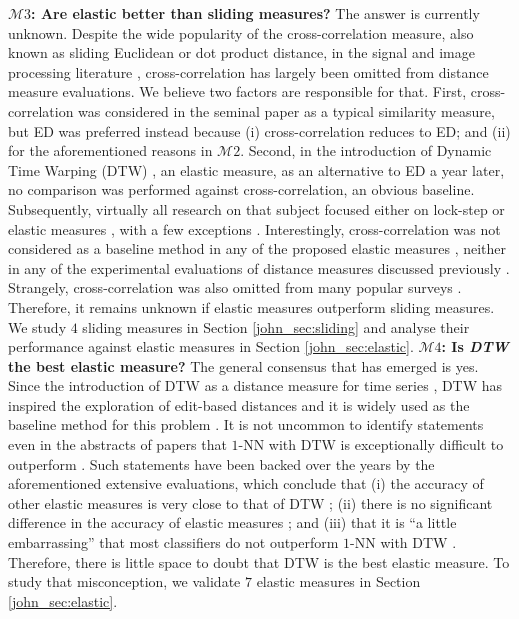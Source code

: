 \documentclass[11pt]{article}
\begin{document}
\newline \textbf{$\mathcal{M}3$: Are elastic better than sliding measures?} The answer is currently unknown. Despite the wide popularity of the cross-correlation measure, also known as sliding Euclidean or dot product distance, in the signal and image processing literature \cite{brown1992survey}, cross-correlation has largely been omitted from distance measure evaluations. We believe two factors are responsible for that. First, cross-correlation was considered in the seminal paper \cite{agrawal1993} as a typical similarity measure, but ED was preferred instead because (i) cross-correlation reduces to ED; and (ii) for the aforementioned reasons in $\mathcal{M}2$. Second, in the introduction of Dynamic Time Warping (DTW) \cite{berndt1994using}, an elastic measure, as an alternative to ED a year later, no comparison was performed against cross-correlation, an obvious baseline. Subsequently, virtually all research on that subject focused either on lock-step or elastic measures \cite{esling2012time,echihabi2018lernaean}, with a few exceptions \cite{li1996hierarchyscan,sakurai2005braid,paparrizos2015k}. Interestingly, cross-correlation was not considered as a baseline method in any of the proposed elastic measures \cite{chen2004marriage,chen2005robust,chen2007spade,morse2007efficient,stefan2013move,vlachos2002discovering}, neither in any of the experimental evaluations of distance measures discussed previously \cite{ding2008querying,wang2013experimental,lines2015time,bagnall2017great}. Strangely, cross-correlation was also omitted from many popular surveys \cite{esling2012time,ralanamahatana2005mining}. Therefore, it remains unknown if elastic measures outperform sliding measures. We study $4$ sliding measures in Section \ref{john_sec:sliding} and analyse their performance against elastic measures in Section \ref{john_sec:elastic}.
\newline \textbf{$\mathcal{M}4$: Is {\em DTW} the best elastic measure?} The general consensus that has emerged is yes. Since the introduction of DTW as a distance measure for time series \cite{berndt1994using}, DTW has inspired the exploration of edit-based distances and it is widely used as the baseline method for this problem \cite{chen2004marriage,chen2005robust,chen2007spade,morse2007efficient,stefan2013move,vlachos2002discovering,lines2015time,paparrizos2015k,bagnall2017great}. It is not uncommon to identify statements even in the abstracts of papers that $1$-NN with DTW is exceptionally difficult to outperform \cite{xi2006fast,petitjean2011global,petitjean2014dynamic,petitjean2016faster}. Such statements have been backed over the years by the aforementioned extensive evaluations, which conclude that (i) the accuracy of other elastic measures is very close to that of DTW \cite{ding2008querying,wang2013experimental}; (ii) there is no significant difference in the accuracy of elastic measures \cite{lines2015time}; and (iii) that it is ``a little embarrassing'' that most classifiers do not outperform $1$-NN with DTW \cite{bagnall2017great}. Therefore, there is little space to doubt that DTW is the best elastic measure. To study that misconception, we validate $7$ elastic measures in Section \ref{john_sec:elastic}.
\end{document}
